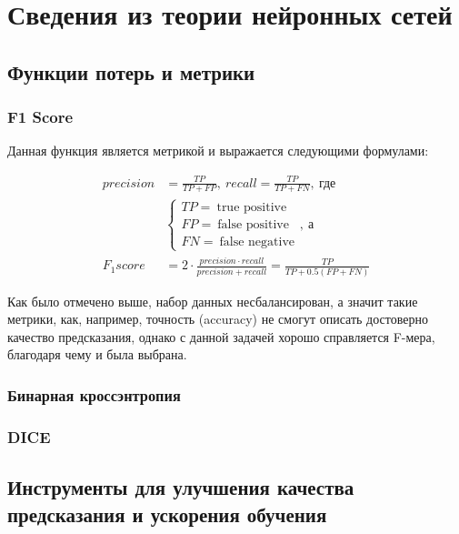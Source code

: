 \chapter{Сведения из теории нейронных сетей}

\section{Функции потерь и метрики}
\subsection{F1 Score}
Данная функция является метрикой и выражается следующими формулами:

\begin{align*}
	precision & = \frac{TP}{TP + FP}, \: recall = \frac{TP}{TP + FN}, \: \text{где}                        \\
	          & \begin{cases}
		            TP = \: \text{true positive}  \\
		            FP = \: \text{false positive} \\
		            FN = \: \text{false negative}
	            \end{cases}, \: \text{а}                                                              \\
	F_1score  & = 2 \cdot \frac{precision \cdot recall}{precision + recall} = \frac{TP}{TP + 0.5(FP + FN)}
\end{align*}

Как было отмечено выше, набор данных несбалансирован, а значит такие метрики, как,
например, точность (accuracy) не смогут описать достоверно качество
предсказания, однако с данной задачей хорошо справляется F-мера, благодаря чему
и была выбрана.

\subsection{Бинарная кроссэнтропия}

\subsection{DICE}

\section{Инструменты для улучшения качества предсказания и ускорения обучения}

